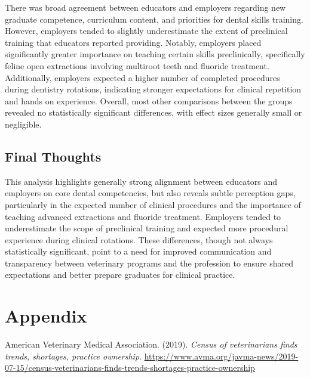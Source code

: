 \documentclass[
  12pt,
  letterpaper,
  DIV=11,
  numbers=noendperiod]{scrartcl}
\newlength{\cslhangindent}
\newenvironment{CSLReferences}[2] %
 {\begin{list}{}{%
  \setlength{\itemindent}{0pt}
  \setlength{\leftmargin}{0pt}
  \setlength{\parsep}{0pt}
  \ifodd #1
   \setlength{\leftmargin}{\cslhangindent}
   \setlength{\itemindent}{-1\cslhangindent}
  \fi
  \setlength{\itemsep}{#2\baselineskip}}}
 {\end{list}}
\numberwithin{figure}{section}
\numberwithin{table}{section}
\begin{document}
There was broad agreement between educators and employers regarding new
graduate competence, curriculum content, and priorities for dental
skills training. However, employers tended to slightly underestimate the
extent of preclinical training that educators reported providing.
Notably, employers placed significantly greater importance on teaching
certain skills preclinically, specifically feline open extractions
involving multiroot teeth and fluoride treatment. Additionally,
employers expected a higher number of completed procedures during
dentistry rotations, indicating stronger expectations for clinical
repetition and hands on experience. Overall, most other comparisons
between the groups revealed no statistically significant differences,
with effect sizes generally small or negligible.

\subsection{Final Thoughts}\label{final-thoughts}

This analysis highlights generally strong alignment between educators
and employers on core dental competencies, but also reveals subtle
perception gaps, particularly in the expected number of clinical
procedures and the importance of teaching advanced extractions and
fluoride treatment. Employers tended to underestimate the scope of
preclinical training and expected more procedural experience during
clinical rotations. These differences, though not always statistically
significant, point to a need for improved communication and transparency
between veterinary programs and the profession to ensure shared
expectations and better prepare graduates for clinical practice.

\section*{Appendix}\label{appendix}

\label{refs}
\begin{CSLReferences}{1}{0}
American Veterinary Medical Association. (2019). \emph{Census of
veterinarians finds trends, shortages, practice ownership}.
\url{https://www.avma.org/javma-news/2019-07-15/census-veterinarians-finds-trends-shortages-practice-ownership}

\end{CSLReferences}
\end{document}
